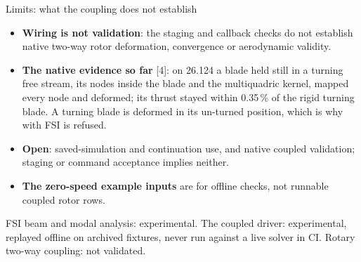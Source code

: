 \begin{frame}{Limits: what the coupling does not establish}
\begin{itemize}\small
  \item \textbf{Wiring is not validation}: the staging and callback checks do
        not establish native two-way rotor deformation, convergence or
        aerodynamic validity.
  \item \textbf{The native evidence so far} [4]: on 26.124 a blade held
        still in a turning free stream, its nodes inside the blade and the
        multiquadric kernel, mapped every node and deformed; its thrust stayed
        within 0.35\,\% of the rigid turning blade. A turning blade is
        deformed in its un-turned position, which is why
         with FSI is refused.
  \item \textbf{Open}: saved-simulation and continuation use, and native
        coupled validation; staging or command acceptance implies neither.
  \item \textbf{The zero-speed example inputs} are for offline checks, not
        runnable coupled rotor rows.
\end{itemize}
\begin{ftslimit}
\scriptsize FSI beam and modal analysis: experimental. The coupled driver:
experimental, replayed offline on archived fixtures, never run against a live
solver in CI. Rotary two-way coupling: not validated.
\end{ftslimit}
\vspace{-1.5mm}
\end{frame}

